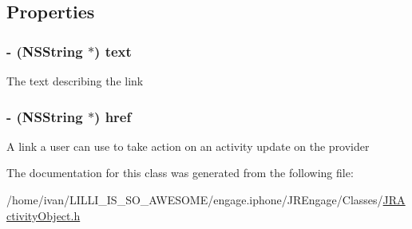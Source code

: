 \subsection{Properties}
\hypertarget{interface_j_r_action_link_a062c02005f1c35e651ffbcab51c50b21}{
\subsubsection[{text}]{\setlength{\rightskip}{0pt plus 5cm}-\/ (NSString $\ast$) text}}
\label{interface_j_r_action_link_a062c02005f1c35e651ffbcab51c50b21}
The text describing the link \hypertarget{interface_j_r_action_link_a45489781731e5965e20fa66af0bd3072}{
\subsubsection[{href}]{\setlength{\rightskip}{0pt plus 5cm}-\/ (NSString $\ast$) href}}
\label{interface_j_r_action_link_a45489781731e5965e20fa66af0bd3072}
A link a user can use to take action on an activity update on the provider 

The documentation for this class was generated from the following file:\begin{DoxyCompactItemize}
\item 
/home/ivan/LILLI\_\-IS\_\-SO\_\-AWESOME/engage.iphone/JREngage/Classes/\hyperlink{_j_r_activity_object_8h}{JRActivityObject.h}\end{DoxyCompactItemize}
